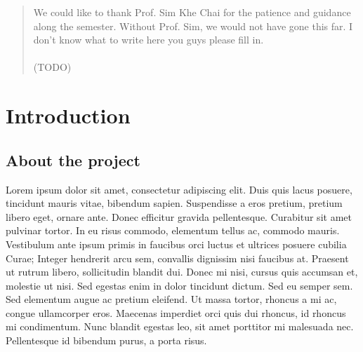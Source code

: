 \documentclass[12pt,a4paper,oneside]{report}
\begin{document}
\renewcommand{\abstractname}{Acknowledgements}
\begin{abstract}
\setcounter{page}{3}
\thispagestyle{plain}
\onehalfspacing
{}
We could like to thank Prof. Sim Khe Chai for the patience and guidance along the semester. Without Prof. Sim, we would not have gone this far. I don't know what to write here you guys please fill in. \\\\
(TODO)
\end{abstract}

\onehalfspacing
\tableofcontents
\thispagestyle{empty}

\chapter{Introduction}
\setcounter{page}{1}
\section{About the project}
Lorem ipsum dolor sit amet, consectetur adipiscing elit. Duis quis lacus posuere, tincidunt mauris vitae, bibendum sapien. Suspendisse a eros pretium, pretium libero eget, ornare ante. Donec efficitur gravida pellentesque. Curabitur sit amet pulvinar tortor. In eu risus commodo, elementum tellus ac, commodo mauris. Vestibulum ante ipsum primis in faucibus orci luctus et ultrices posuere cubilia Curae; Integer hendrerit arcu sem, convallis dignissim nisi faucibus at. Praesent ut rutrum libero, sollicitudin blandit dui. Donec mi nisi, cursus quis accumsan et, molestie ut nisi. Sed egestas enim in dolor tincidunt dictum. Sed eu semper sem. Sed elementum augue ac pretium eleifend. Ut massa tortor, rhoncus a mi ac, congue ullamcorper eros. Maecenas imperdiet orci quis dui rhoncus, id rhoncus mi condimentum. Nunc blandit egestas leo, sit amet porttitor mi malesuada nec. Pellentesque id bibendum purus, a porta risus.
\end{document}
